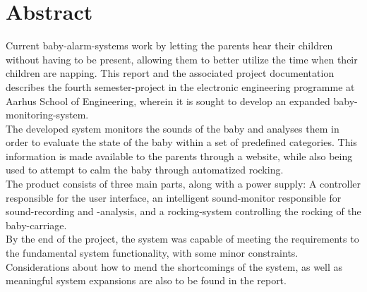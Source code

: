 \chapter{Abstract}

Current baby-alarm-systems work by letting the parents hear their children without having to be present, allowing them to better utilize the time when their children are napping.
This report and the associated project documentation describes the fourth semester-project in the electronic engineering programme at Aarhus School of Engineering, wherein it is sought to develop an expanded baby-monitoring-system.\\
The developed system monitors the sounds of the baby and analyses them in order to evaluate the state of the baby within a set of predefined categories. This information is made available to the parents through a website, while also being used to attempt to calm the baby through automatized rocking.\\
The product consists of three main parts, along with a power supply: A controller responsible for the user interface, an intelligent sound-monitor responsible for sound-recording and -analysis, and a rocking-system controlling the rocking of the baby-carriage.\\
By the end of the project, the system was capable of meeting the requirements to the fundamental system functionality, with some minor constraints. Considerations about how to mend the shortcomings of the system, as well as meaningful system expansions are also to be found in the report.\\

